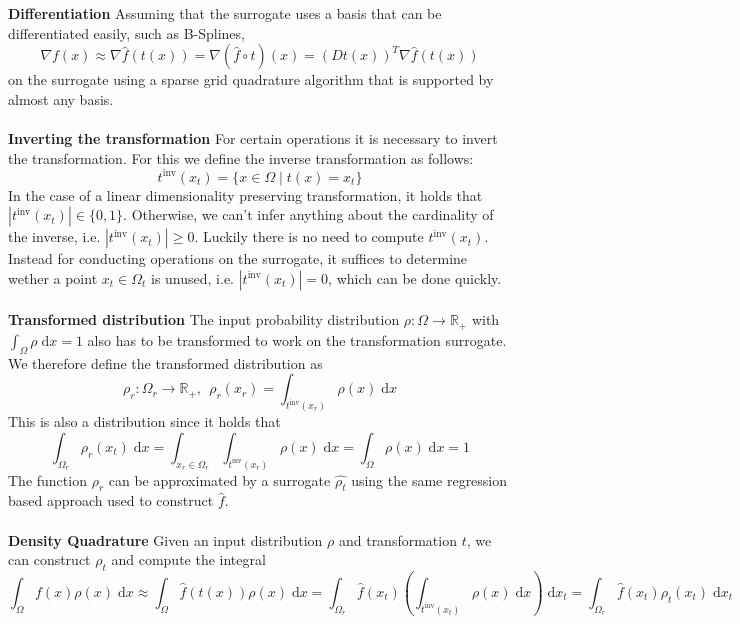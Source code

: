 \documentclass[
  a4paper,  %
  twoside,  %
  bibliography=totoc,
  headsepline,
  cleardoublepage=empty,
  parskip=half,
  draft=false
]{scrbook}
\begin{document}
\textbf{Differentiation }
Assuming that the surrogate uses a basis that can be differentiated easily, such as B-Splines, 
\begin{equation}
\nabla f(x) \approx \nabla \hat{f}(t(x)) = \nabla (\hat{f} \circ t)(x)=(Dt(x))^T \nabla \hat{f}(t(x))
\end{equation}
on the surrogate using a sparse grid quadrature algorithm that is supported by almost any basis.
\\
\\
\textbf{Inverting the transformation  }
For certain operations it is necessary to invert the transformation.
For this we define the inverse transformation as follows:
\begin{equation}
t^{\text{inv}}(x_{t})=\{x \in \Omega \mid t(x)=x_{t}\}
\end{equation}
In the case of a linear dimensionality preserving transformation, it holds that $|t^{\text{inv}}(x_{t})| \in \{0,1\}$.
Otherwise, we can't infer anything about the cardinality of the inverse, i.e. $|t^{\text{inv}}(x_{t})| \geq 0$.
Luckily there is no need to compute $t^{\text{inv}}(x_{t})$. Instead for conducting operations on the surrogate, it suffices to determine wether a point $x_t \in \Omega_t$ is unused, i.e. $|t^{\text{inv}}(x_{t})| = 0$, which can be done quickly.
\\
\\
\textbf{Transformed distribution}
The input probability distribution $\rho \colon \Omega \to \mathds{R_+}$ with $\int_{\Omega} \rho \; \text{d}x = 1$ also has to be transformed to work on the transformation surrogate.
We therefore define the transformed distribution as
\begin{equation}
\rho_r \colon \Omega_r \to \mathds{R_+}, ~~ \rho_r(x_r)=\int_{t^{\text{inv}}(x_r)} \rho(x) \; \text{d}x 
\end{equation}
This is also a distribution since it holds that
\begin{equation}
\int_{\Omega_r} \rho_r(x_t) \; \text{d}x=\int_{x_r \in \Omega_r} \int_{t^{\text{inv}}(x_r)} \rho(x) \; \text{d}x = \int_{\Omega} \rho(x) \; \text{d}x = 1
\end{equation}
The function $\rho_r$ can be approximated by a surrogate $\hat{\rho_t}$ using the same regression based approach used to construct $\hat{f}$.
\\
\\
\textbf{Density Quadrature}
Given an input distribution $\rho$ and transformation $t$, we can construct $\rho_t$ and compute the integral
\begin{equation}
\int_{\Omega} f(x) \rho(x) \; \text{d}x \approx \int_{\Omega} \hat{f}(t(x)) \rho(x) \; \text{d}x
=
\int_{\Omega_r} \hat{f}(x_t) \left(\int_{t^{\text{inv}}(x_t)} \rho(x)  \; \text{d}x \right)  \; \text{d}x_t=
\int_{\Omega_r} \hat{f}(x_t) \rho_t(x_t) \; \text{d}x_t
\end{equation}
\end{document}
